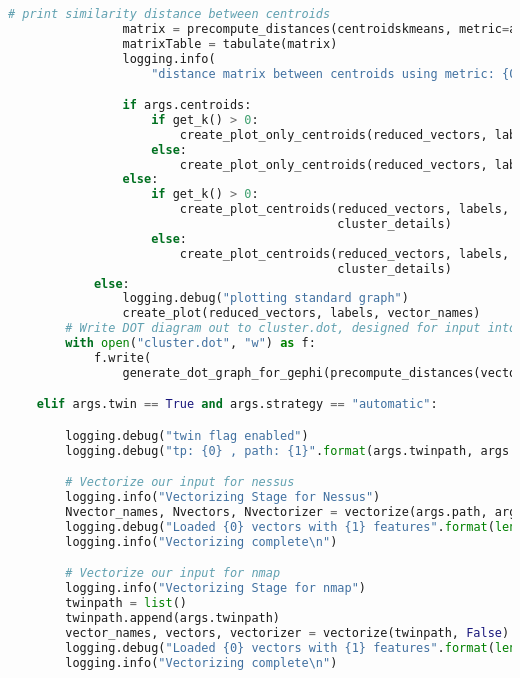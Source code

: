 \begin{lstlisting}[language=python]
                # print similarity distance between centroids
                matrix = precompute_distances(centroidskmeans, metric=args.metric)
                matrixTable = tabulate(matrix)
                logging.info(
                    "distance matrix between centroids using metric: {0} :\n{1}".format(args.metric, matrixTable))

                if args.centroids:
                    if get_k() > 0:
                        create_plot_only_centroids(reduced_vectors, labels, vector_names, centroidskmeans, get_k())
                    else:
                        create_plot_only_centroids(reduced_vectors, labels, vector_names, centroidskmeans, args.n_clusters)
                else:
                    if get_k() > 0:
                        create_plot_centroids(reduced_vectors, labels, vector_names, centroidskmeans, get_k(),
                                              cluster_details)
                    else:
                        create_plot_centroids(reduced_vectors, labels, vector_names, centroidskmeans, args.n_clusters,
                                              cluster_details)
            else:
                logging.debug("plotting standard graph")
                create_plot(reduced_vectors, labels, vector_names)
        # Write DOT diagram out to cluster.dot, designed for input into Gephi (https://gephi.org/)
        with open("cluster.dot", "w") as f:
            f.write(
                generate_dot_graph_for_gephi(precompute_distances(vectors, metric=args.metric), vector_names, labels))

    elif args.twin == True and args.strategy == "automatic":

        logging.debug("twin flag enabled")
        logging.debug("tp: {0} , path: {1}".format(args.twinpath, args.path))

        # Vectorize our input for nessus
        logging.info("Vectorizing Stage for Nessus")
        Nvector_names, Nvectors, Nvectorizer = vectorize(args.path, args.nessus)
        logging.debug("Loaded {0} vectors with {1} features".format(len(Nvector_names), Nvectors.shape[1]))
        logging.info("Vectorizing complete\n")

        # Vectorize our input for nmap
        logging.info("Vectorizing Stage for nmap")
        twinpath = list()
        twinpath.append(args.twinpath)
        vector_names, vectors, vectorizer = vectorize(twinpath, False)
        logging.debug("Loaded {0} vectors with {1} features".format(len(vector_names), vectors.shape[1]))
        logging.info("Vectorizing complete\n")


\end{lstlisting}
